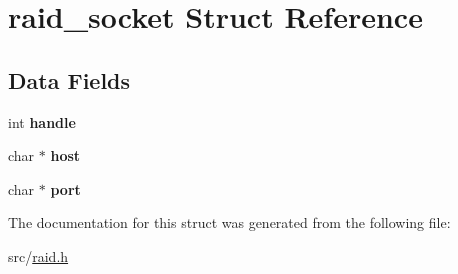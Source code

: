 \hypertarget{structraid__socket}{}\section{raid\+\_\+socket Struct Reference}
\label{structraid__socket}
\subsection*{Data Fields}
\begin{DoxyCompactItemize}
\item 
int {\bfseries handle}\hypertarget{structraid__socket_a8d482a43405ed9519dd6685494a902ef}{}\label{structraid__socket_a8d482a43405ed9519dd6685494a902ef}

\item 
char $\ast$ {\bfseries host}\hypertarget{structraid__socket_a50ed6bef606c22e4e264fc55846df4df}{}\label{structraid__socket_a50ed6bef606c22e4e264fc55846df4df}

\item 
char $\ast$ {\bfseries port}\hypertarget{structraid__socket_a03872ecaeda291bbf9df614b79006471}{}\label{structraid__socket_a03872ecaeda291bbf9df614b79006471}

\end{DoxyCompactItemize}


The documentation for this struct was generated from the following file\+:\begin{DoxyCompactItemize}
\item 
src/\hyperlink{raid_8h}{raid.\+h}\end{DoxyCompactItemize}
